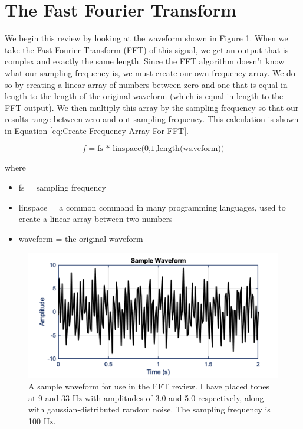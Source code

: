 \section{The Fast Fourier Transform} \label{sec:The Fast Fourier Transform}

We begin this review by looking at the waveform shown in Figure \ref{fig:FFT Sample Waveform}.
When we take the Fast Fourier Transform (FFT) of this signal, we get an output that is complex and exactly the same length.
Since the FFT algorithm doesn't know what our sampling frequency is, we must create our own frequency array. We do so by creating a linear array of numbers between zero and one that is equal in length to the length of the original waveform (which is equal in length to the FFT output).
We then multiply this array by the sampling frequency so that our results range between zero and out sampling frequency.
This calculation is shown in Equation \ref{eq:Create Frequency Array For FFT}.

\begin{equation} \label{eq:Create Frequency Array For FFT}
    f = \text{fs * linspace(0,1,length(waveform))}
\end{equation}

where

\begin{itemize}
    \item fs = sampling frequency
    \item linspace = a common command in many programming languages, used to create a linear array between two numbers
    \item waveform = the original waveform
\end{itemize}

\begin{figure}[H]
    \centering
    \includegraphics[width = 6 in]{Chapters/Signal Processing/Figures/Sample Waveform.png}
    \caption{A sample waveform for use in the FFT review. I have placed tones at 9 and 33 Hz with amplitudes of 3.0 and 5.0 respectively, along with gaussian-distributed random noise. The sampling frequency is 100 Hz.}
    \label{fig:FFT Sample Waveform}
\end{figure}

